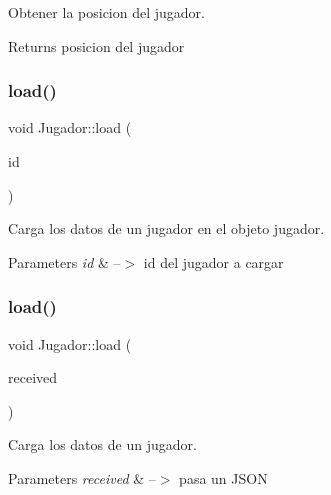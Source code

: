 Obtener la posicion del jugador. 

\begin{DoxyReturn}{Returns}
posicion del jugador 
\end{DoxyReturn}
\mbox{\label{classJugador_a500d0e508636a711ae941b7557641c1a}} 
\subsubsection{\texorpdfstring{load()}{load()}\hspace{0.1cm}{\footnotesize\ttfamily [1/2]}}
{\footnotesize\ttfamily void Jugador\+::load (\begin{DoxyParamCaption}\item[{int}]{id }\end{DoxyParamCaption})}



Carga los datos de un jugador en el objeto jugador. 


\begin{DoxyParams}{Parameters}
{\em id} & --$>$ id del jugador a cargar \\
\hline
\end{DoxyParams}
\mbox{\label{classJugador_ae2da8cec1afc1c566872dcc27f41e955}} 
\subsubsection{\texorpdfstring{load()}{load()}\hspace{0.1cm}{\footnotesize\ttfamily [2/2]}}
{\footnotesize\ttfamily void Jugador\+::load (\begin{DoxyParamCaption}\item[{\mbox{\hyperlink{jugador_8h_ab6104b89642419db4e355b7b2e40abbe}{J\+S\+ON}}}]{received }\end{DoxyParamCaption})}



Carga los datos de un jugador. 


\begin{DoxyParams}{Parameters}
{\em received} & --$>$ pasa un J\+S\+ON \\
\hline
\end{DoxyParams}
\mbox{\label{classJugador_a259600a922dca782041b65d3a35220ae}} 
